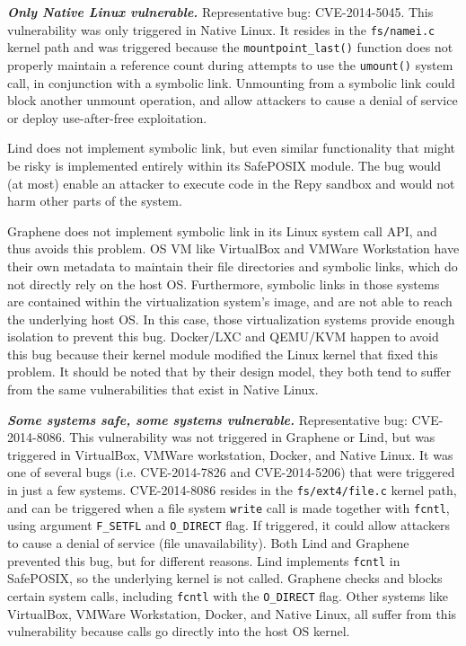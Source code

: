 {{\emph{\textbf{Only Native Linux vulnerable.}}  Representative bug: CVE-2014-5045.
This vulnerability was only triggered in Native Linux. It resides in the
\texttt{fs/namei.c} kernel path and was triggered because
the \texttt{mountpoint\_last()}
function does not properly
maintain a reference count during attempts to use the \texttt{umount()} system call,
in conjunction with a symbolic link. Unmounting from a symbolic link could block
another unmount operation, and allow attackers to cause a denial of service or
deploy use-after-free exploitation.

Lind does not implement symbolic link, but
even similar functionality that might be risky is implemented entirely
within its SafePOSIX module. The bug would (at most) enable an attacker to execute
code in the Repy sandbox and would not harm other parts of the system.

Graphene does not implement symbolic link in its Linux system call API, and thus avoids
this problem.
OS VM like VirtualBox and VMWare Workstation have their own metadata to maintain their file
directories and symbolic links, which do not directly rely on the host OS.
Furthermore, symbolic links in those systems are contained within the virtualization system's image,
and are not able to reach the underlying host OS. In this case, those virtualization systems provide enough
isolation to prevent this bug.
Docker/LXC and QEMU/KVM happen to avoid this bug because their kernel module modified the Linux kernel
that fixed this problem. It should be noted that by their design model, they both tend to suffer from
the same vulnerabilities that exist in Native Linux.

\emph{\textbf{Some systems safe, some systems vulnerable.}}  Representative bug: CVE-2014-8086.
This vulnerability was not triggered in Graphene or Lind, but was triggered in
VirtualBox, VMWare workstation, Docker, and Native Linux. It was one of several
bugs (i.e. CVE-2014-7826 and CVE-2014-5206) that were triggered in just a few systems.
CVE-2014-8086 resides in the \texttt{fs/ext4/file.c} kernel path, and can be
triggered when a file system \texttt{write}
call is made together with \texttt{fcntl}, 
using argument \texttt{F\_SETFL} and \texttt{O\_DIRECT} flag. If triggered, it could
allow attackers to cause a denial of service (file unavailability). Both Lind and
Graphene prevented this bug, but for different reasons. Lind
implements \texttt{fcntl} in SafePOSIX, so the underlying kernel is not called.
Graphene checks and blocks certain system calls, including
\texttt{fcntl} with the \texttt{O\_DIRECT} flag.
Other systems like VirtualBox, VMWare Workstation, Docker, and Native Linux,
all suffer from this vulnerability because calls go directly into the host OS
kernel.

}}
